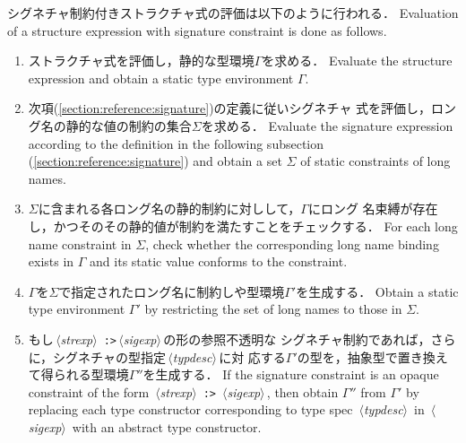 \documentclass{jbook}
\newcommand{\nonterm}[1]{\mbox{$\,\langle$}{\it #1}\mbox{$\rangle\,$}}
\newcommand{\term}[1]{\mbox{{\tt #1}}}
\newcommand{\ass}{\Gamma}
\begin{document}
\begin{itemize}
\ifjp%
	シグネチャ制約付きストラクチャ式の評価は以下のように行われる．
\else%
	Evaluation of a structure expression with signature constraint
is done as follows.
\fi%
\begin{enumerate}
\item 
\ifjp%
	ストラクチャ式を評価し，静的な型環境$\ass$を求める．
\else%
	Evaluate the structure expression and obtain a static type
environment $\ass$.
\fi%
\item 
\ifjp%
	次項(\ref{section:reference:signature})の定義に従いシグネチャ
式を評価し，ロング名の静的な値の制約の集合$\Sigma$を求める． 
\else%
	Evaluate the signature expression according to the definition
in the following subsection (\ref{section:reference:signature}) and 
obtain a set $\Sigma$ of static constraints of long names.
\fi%

\item 
\ifjp%
	$\Sigma$に含まれる各ロング名の静的制約に対しして，$\ass$にロング
名束縛が存在し，かつそのその静的値が制約を満たすことをチェックする．
\else%
	For each long name constraint in $\Sigma$, check whether the
corresponding long name binding exists in $\ass$ and its static value
conforms to the constraint.
\fi%

\item 
\ifjp%
	$\ass$を$\Sigma$で指定されたロング名に制約しや型環境$\ass'$を生成する．
\else%
	Obtain a static type environment $\ass'$ by restricting the set
of long names to those in $\Sigma$.
\fi%

\item 
\ifjp%
	もし\nonterm{strexp} \term{:>}\nonterm{sigexp}の形の参照不透明な
シグネチャ制約であれば，さらに，シグネチャの型指定\nonterm{typdesc}に対
応する$\ass'$の型を，抽象型で置き換えて得られる型環境$\ass''$を生成する．
\else%
	If the signature constraint is an opaque constraint of the form
\nonterm{strexp} \term{:>} \nonterm{sigexp},
then obtain $\ass''$ from $\ass'$ by replacing
each type constructor corresponding to type spec \nonterm{typdesc} in
\nonterm{sigexp} with an abstract type constructor.
\fi%


\end{enumerate}
\end{itemize}
\end{document}

